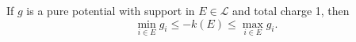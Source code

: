 If $g$ is a pure potential with support in $E \in \mathcal{L}$ and total charge 1, then
$$\min_{i \in E} g_i \leq -k(E) \leq \max_{i \in E} g_i.$$

